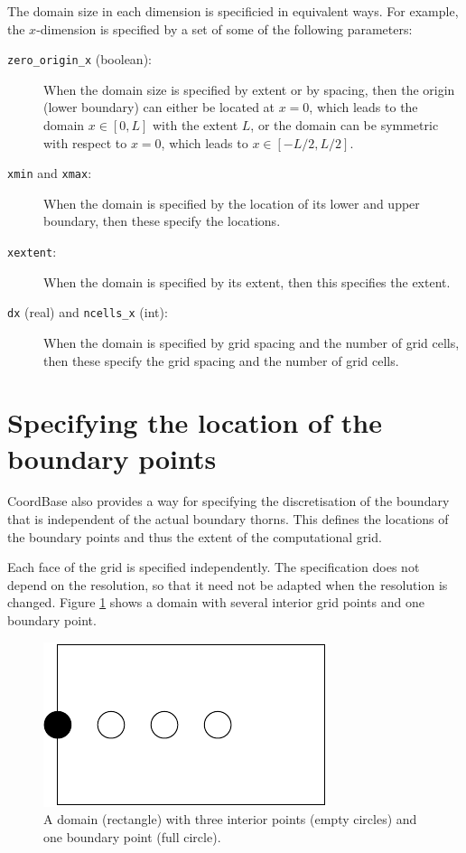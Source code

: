 The domain size in each dimension is specificied in equivalent ways.
For example, the $x$-dimension is specified by a set of some of the
following parameters:
\begin{description}
\item[{\texttt{zero\_origin\_x}} (boolean):]
When the domain size is specified by extent or by spacing, then the
origin (lower boundary) can either be located at $x=0$, which leads to
the domain $x \in [0,L]$ with the extent $L$, or the domain can be
symmetric with respect to $x=0$, which leads to $x \in [-L/2,L/2]$.
\item[{\texttt{xmin}} and {\texttt{xmax}}:]
When the domain is specified by the location of its lower and upper
boundary, then these specify the locations.
\item[{\texttt{xextent}}:]
When the domain is specified by its extent, then this specifies the
extent.
\item[{\texttt{dx}} (real) and {\texttt{ncells\_x}} (int):]
When the domain is specified by grid spacing and the number of grid
cells, then these specify the grid spacing and the number of grid
cells.
\end{description}


\section{Specifying the location of the boundary points}
\label{CactusBase:CoordBase:boundary}

CoordBase also provides a way for specifying the discretisation of the
boundary that is independent of the actual boundary thorns.  This
defines the locations of the boundary points and thus the extent of
the computational grid.

Each face of the grid is specified independently.  The specification
does not depend on the resolution, so that it need not be adapted when
the resolution is changed.  Figure
{\ref{CactusBase:CoordBase:fig-domain}} shows a domain with several
interior grid points and one boundary point.

\begin{figure}
\begin{center}
\includegraphics[scale=0.75]{domain}
\end{center}
\caption{A domain (rectangle) with three interior points (empty
circles) and one boundary point (full circle).}
\label{CactusBase:CoordBase:fig-domain}
\end{figure}


